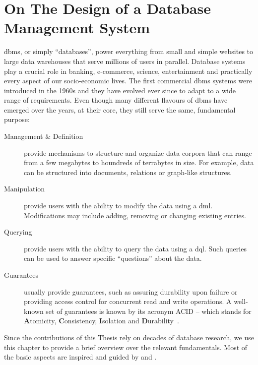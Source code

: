 \chapter{On The Design of a Database Management System}
\label{chapter:theory_databases}


\gls{dbms}{}, or simply ``databases'', power everything from small and simple websites to large data warehouses that serve millions of users in parallel. Database systems play a crucial role in banking, e-commerce, science, entertainment and practically every aspect of our socio-economic lives. The first commercial \gls{dbms} systems were introduced in the 1960s \cite{Garcia:2009Database} and they have evolved ever since to adapt to a wide range of requirements. Even though many different flavours of \gls{dbms} have emerged over the years, at their core, they still serve the same, fundamental purpose:

\begin{description}
    \item[Management \& Definition]  provide mechanisms to structure and organize data corpora that can range from a few megabytes to houndreds of terrabytes in size. For example, data can be structured into documents, relations or graph-like structures.
    \item[Manipulation]  provide users with the ability to modify the data using a \gls{dml}. Modifications may include adding, removing or changing existing entries.
    \item[Querying]  provide users with the ability to query the data using a \gls{dql}. Such queries can be used to answer specific ``questions'' about the data.
    \item[Guarantees]  usually provide guarantees, such as assuring durability upon failure or providing access control for concurrent read and write operations. A well-known set of guarantees is known by its acronym ACID -- which stands for \textbf{A}tomicity, \textbf{C}onsistency, \textbf{I}solation and \textbf{D}urability~\cite{Haerder:1983principles}.
\end{description}

Since the contributions of this Thesis rely on decades of database research, we use this chapter to provide a brief overview over the relevant fundamentals. Most of the basic aspects are inspired and guided by \cite{Garcia:2009Database} and \cite{Petrov:2019Database}.


